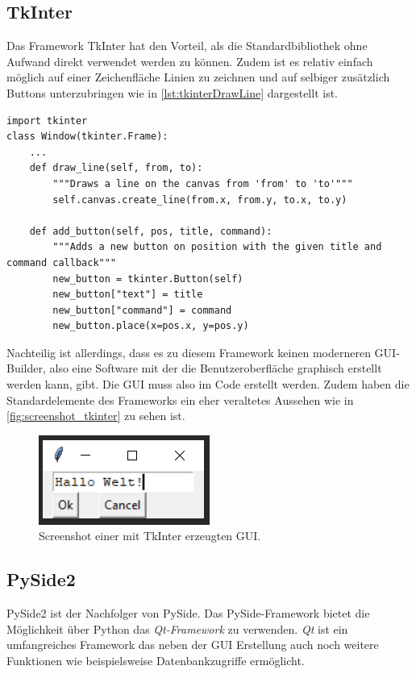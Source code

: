 \subsection{TkInter}
Das Framework TkInter hat den Vorteil, als die Standardbibliothek ohne Aufwand direkt verwendet werden zu können. Zudem ist es relativ einfach möglich auf einer Zeichenfläche Linien zu zeichnen und auf selbiger zusätzlich Buttons unterzubringen wie in \autoref{lst:tkinterDrawLine} dargestellt ist.
\begin{lstlisting}[caption={Zeichnen von Linien und Buttons mit TkInter},label=lst:tkinterDrawLine]
import tkinter
class Window(tkinter.Frame):
	...
	def draw_line(self, from, to):
		"""Draws a line on the canvas from 'from' to 'to'"""
		self.canvas.create_line(from.x, from.y, to.x, to.y)
	
	def add_button(self, pos, title, command):
		"""Adds a new button on position with the given title and command callback"""
		new_button = tkinter.Button(self)
		new_button["text"] = title
		new_button["command"] = command
		new_button.place(x=pos.x, y=pos.y)
\end{lstlisting}

Nachteilig ist allerdings, dass es zu diesem Framework keinen moderneren \ac{GUI}-Builder, also eine Software mit der die Benutzeroberfläche graphisch erstellt werden kann, gibt. Die \ac{GUI} muss also im Code erstellt werden. Zudem haben die Standardelemente des Frameworks ein eher veraltetes Aussehen wie in \autoref{fig:screenshot_tkinter} zu sehen ist.

\begin{figure}[h]
\begin{center}
\includegraphics[scale=0.7]{images/tkinter_screenshot.png}
\caption{Screenshot einer mit TkInter erzeugten GUI.}
\label{fig:screenshot_tkinter}
\end{center}
\end{figure}

\subsection{PySide2}
PySide2 ist der Nachfolger von PySide. Das PySide-Framework bietet die Möglichkeit über Python das \textit{Qt-Framework} zu verwenden. \textit{Qt} ist ein umfangreiches Framework das neben der \ac{GUI} Erstellung auch noch weitere Funktionen wie beispielsweise Datenbankzugriffe ermöglicht.

